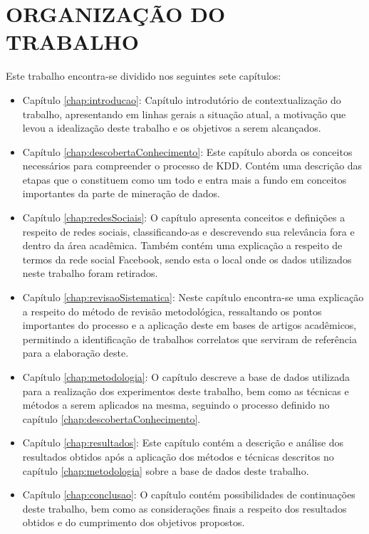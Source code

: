 \section{ORGANIZAÇÃO DO TRABALHO}
\label{sec:organizacaoTrabalho}
Este trabalho encontra-se dividido nos seguintes sete capítulos:

\begin{itemize}
	\item Capítulo \ref{chap:introducao}: Capítulo introdutório de contextualização do trabalho, apresentando em linhas gerais a situação atual, a motivação que levou a idealização deste trabalho e os objetivos a serem alcançados.

	\item Capítulo \ref{chap:descobertaConhecimento}: Este capítulo aborda os conceitos necessários para compreender o processo de KDD. Contém uma descrição das etapas que o constituem como um todo e entra mais a fundo em conceitos importantes da parte de mineração de dados.

	\item Capítulo \ref{chap:redesSociais}: O capítulo apresenta conceitos e definições a respeito de redes sociais, classificando-as e descrevendo sua relevância fora e dentro da área acadêmica. Também contém uma explicação a respeito de termos da rede social Facebook, sendo esta o local onde os dados utilizados neste trabalho foram retirados.

	\item Capítulo \ref{chap:revisaoSistematica}: Neste capítulo encontra-se uma explicação a respeito do método de revisão metodológica, ressaltando os pontos importantes do processo e a aplicação deste em bases de artigos acadêmicos, permitindo a identificação de trabalhos correlatos que serviram de referência para a elaboração deste.

	\item Capítulo \ref{chap:metodologia}: O capítulo descreve a base de dados utilizada para a realização dos experimentos deste trabalho, bem como as técnicas e métodos a serem aplicados na mesma, seguindo o processo definido no capítulo \ref{chap:descobertaConhecimento}.

	\item Capítulo \ref{chap:resultados}: Este capítulo contém a descrição e análise dos resultados obtidos após a aplicação dos métodos e técnicas descritos no capítulo \ref{chap:metodologia} sobre a base de dados deste trabalho.

	\item Capítulo \ref{chap:conclusao}: O capítulo contém possibilidades de continuações deste trabalho, bem como as considerações finais a respeito dos resultados obtidos e do cumprimento dos objetivos propostos.
\end{itemize}